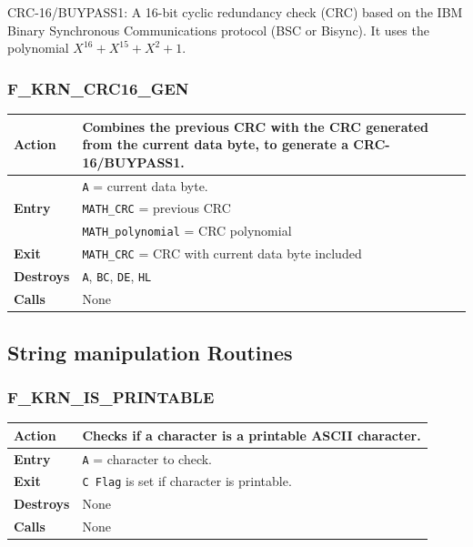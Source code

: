 \documentclass[a4paper,11pt]{article}
\begin{document}
        CRC-16/BUYPASS1: A 16-bit cyclic redundancy check (CRC) based on the IBM
        Binary Synchronous Communications protocol (BSC or Bisync). It uses the
        polynomial $X^{16} + X^{15} +X^2 + 1$.

        \subsubsection{F\_KRN\_CRC16\_GEN}
        \label{func:fkrncrc16gen}
        \begin{tabular}{l p{9cm}}
            \hline\textbf{Action}
            & Combines the previous CRC with the CRC generated from the current
            data byte, to generate a CRC-16/BUYPASS1.\\
            \hline\multirow[t]{3}{4em}{\textbf{Entry}}
            & \texttt{A} = current data byte.\\
            & \texttt{MATH\_CRC} = previous CRC\\
            & \texttt{MATH\_polynomial} = CRC polynomial\\
            \hline\textbf{Exit}
            & \texttt{MATH\_CRC} = CRC with current data byte included\\
            \hline\textbf{Destroys} & \texttt{A}, \texttt{BC}, \texttt{DE}, \texttt{HL} \\
            \hline\textbf{Calls} & None\\
            \hline
        \end{tabular}

    \subsection{String manipulation Routines}

        \subsubsection{F\_KRN\_IS\_PRINTABLE}
        \label{func:fkrnisprintable}
        \begin{tabular}{l p{9cm}}
            \hline\textbf{Action}
            & Checks if a character is a printable ASCII character.\\
            \hline\textbf{Entry} & \texttt{A} = character to check.\\
            \hline\textbf{Exit} & \texttt{C Flag} is set if character is printable.\\
            \hline\textbf{Destroys} & None\\
            \hline\textbf{Calls} & None\\
            \hline
        \end{tabular}
\end{document}
